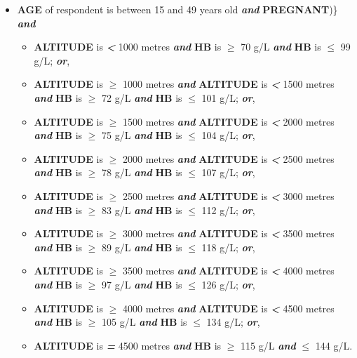 \documentclass[12pt,a4paper]{article}
\begin{document}
\begin{itemize}
\item
  \textbf{AGE} of respondent is between 15 and 49 years old \textbf{\emph{and}} \textbf{PREGNANT})\} \textbf{\emph{and}}

  \begin{itemize}
  \item
    \textbf{ALTITUDE} is \textbf{\emph{\textless{}}} 1000 metres \textbf{\emph{and}} \textbf{HB} is \textbf{\emph{\(\geq\)}} 70 g/L \textbf{\emph{and}} \textbf{HB}
    is \textbf{\emph{\(\leq\)}} 99 g/L; \textbf{\emph{or}},
  \item
    \textbf{ALTITUDE} is \textbf{\emph{\(\geq\)}} 1000 metres \textbf{\emph{and}} \textbf{ALTITUDE} is \textbf{\emph{\textless{}}} 1500 metres \textbf{\emph{and}} \textbf{HB} is \textbf{\emph{\(\geq\)}} 72 g/L \textbf{\emph{and}} \textbf{HB} is \textbf{\emph{\(\leq\)}} 101 g/L; \textbf{\emph{or}},
  \item
    \textbf{ALTITUDE} is \textbf{\emph{\(\geq\)}} 1500 metres \textbf{\emph{and}} \textbf{ALTITUDE} is \textbf{\emph{\textless{}}} 2000 metres \textbf{\emph{and}} \textbf{HB} is \textbf{\emph{\(\geq\)}} 75 g/L \textbf{\emph{and}} \textbf{HB} is \textbf{\emph{\(\leq\)}} 104 g/L; \textbf{\emph{or}},
  \item
    \textbf{ALTITUDE} is \textbf{\emph{\(\geq\)}} 2000 metres \textbf{\emph{and}} \textbf{ALTITUDE} is \textbf{\emph{\textless{}}} 2500 metres \textbf{\emph{and}} \textbf{HB} is \textbf{\emph{\(\geq\)}} 78 g/L \textbf{\emph{and}} \textbf{HB} is \textbf{\emph{\(\leq\)}} 107 g/L; \textbf{\emph{or}},
  \item
    \textbf{ALTITUDE} is \textbf{\emph{\(\geq\)}} 2500 metres \textbf{\emph{and}} \textbf{ALTITUDE} is \textbf{\emph{\textless{}}} 3000 metres \textbf{\emph{and}} \textbf{HB} is \textbf{\emph{\(\geq\)}} 83 g/L \textbf{\emph{and}} \textbf{HB} is \textbf{\emph{\(\leq\)}} 112 g/L; \textbf{\emph{or}},
  \item
    \textbf{ALTITUDE} is \textbf{\emph{\(\geq\)}} 3000 metres \textbf{\emph{and}} \textbf{ALTITUDE} is \textbf{\emph{\textless{}}} 3500 metres \textbf{\emph{and}} \textbf{HB} is \textbf{\emph{\(\geq\)}} 89 g/L \textbf{\emph{and}} \textbf{HB} is \textbf{\emph{\(\leq\)}} 118 g/L; \textbf{\emph{or}},
  \item
    \textbf{ALTITUDE} is \textbf{\emph{\(\geq\)}} 3500 metres \textbf{\emph{and}} \textbf{ALTITUDE} is \textbf{\emph{\textless{}}} 4000 metres \textbf{\emph{and}} \textbf{HB} is \textbf{\emph{\(\geq\)}} 97 g/L \textbf{\emph{and}} \textbf{HB} is \textbf{\emph{\(\leq\)}} 126 g/L; \textbf{\emph{or}},
  \item
    \textbf{ALTITUDE} is \textbf{\emph{\(\geq\)}} 4000 metres \textbf{\emph{and}} \textbf{ALTITUDE} is \textbf{\emph{\textless{}}} 4500 metres \textbf{\emph{and}} \textbf{HB} is \textbf{\emph{\(\geq\)}} 105 g/L \textbf{\emph{and}} \textbf{HB} is \textbf{\emph{\(\leq\)}} 134 g/L; \textbf{\emph{or}},
  \item
    \textbf{ALTITUDE} is \textbf{\emph{=}} 4500 metres \textbf{\emph{and}} \textbf{HB} is \textbf{\emph{\(\geq\)}} 115 g/L \textbf{\emph{and}} \textbf{\emph{\(\leq\)}} 144 g/L.
  \end{itemize}
\end{itemize}
\end{document}
